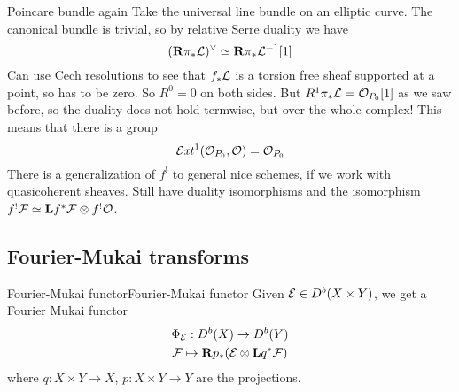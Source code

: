 \begin{example}{Poincare bundle again}{}
Take the universal line bundle on an elliptic curve. The canonical bundle is trivial, so by relative Serre duality we have
\begin{equation*}
    (\mathbf{R}\pi_*\mathcal{L})^\vee \simeq \mathbf{R}\pi_*\mathcal{L}^{-1}[1]
\end{equation*}
Can use Cech resolutions to see that $f_*\mathcal{L}$ is a torsion free sheaf supported at a point, so has to be zero. So $R^0=0$ on both sides. But $R^1\pi_*\mathcal{L}=\mathcal{O}_{P_0}[1]$ as we saw before, so the duality does not hold termwise, but over the whole complex! This means that there is a group
\begin{equation*}
    \operatorname{\mathcal{E}\mathit{xt}}^1(\mathcal{O}_{P_0},\mathcal{O}) = \mathcal{O}_{P_0}
\end{equation*}
There is a generalization of $f^!$ to general nice schemes, if we work with quasicoherent sheaves. Still have duality isomorphisms and the isomorphism $f^!\mathcal{F}\simeq \mathbf{L} f^*\mathcal{F}\otimes f^!\mathcal{O}$.
\end{example}




\subsection{Fourier-Mukai transforms}

\begin{definition}{Fourier-Mukai functor}{Fourier-Mukai functor}
    Given $\mathcal{E}\in D^b(X\times Y)$, we get a Fourier Mukai functor
    \begin{gather*}
        \Phi_{\mathcal{E}} : D^b(X)\to D^b(Y) \\
        \mathcal{F} \mapsto \mathbf{R} p_{*}(\mathcal{E}\otimes\mathbf{L} q^*\mathcal{F})
    \end{gather*}
    where $q:X\times Y\to X$, $p:X\times Y\to Y$ are the projections.
\end{definition}

